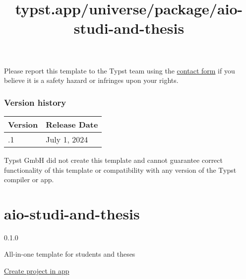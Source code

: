 Please report this template to the Typst team using the
\href{https://typst.app/contact}{contact form} if you believe it is a
safety hazard or infringes upon your rights.

\label{versions}
\subsubsection{Version history}\label{version-history}

\begin{longtable}[]{@{}ll@{}}
\toprule\noalign{}
Version & Release Date \\
\midrule\noalign{}
\endhead
\bottomrule\noalign{}
\endlastfoot
0.1.1 & July 1, 2024 \\
\end{longtable}

Typst GmbH did not create this template and cannot guarantee correct
functionality of this template or compatibility with any version of the
Typst compiler or app.


\title{typst.app/universe/package/aio-studi-and-thesis}

\label{banner}
\label{template-thumbnail}

\section{aio-studi-and-thesis}\label{aio-studi-and-thesis}

{ 0.1.0 }

All-in-one template for students and theses

\href{/app?template=aio-studi-and-thesis&version=0.1.0}{Create project
in app}

